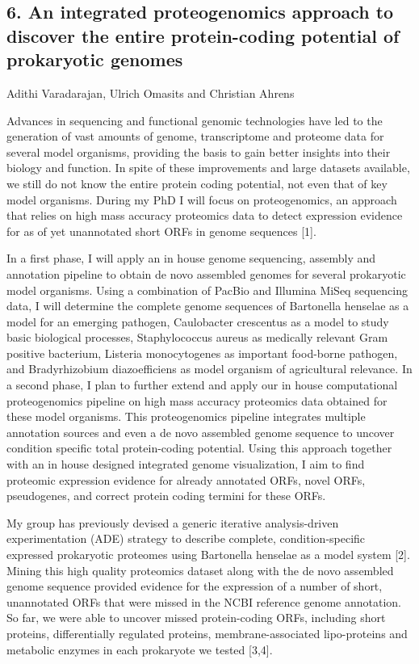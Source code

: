 \subsection*{\color{eubicRed} 6. An integrated proteogenomics approach to discover the entire protein-coding potential of prokaryotic genomes}
{\color{eubicGray}Adithi Varadarajan, Ulrich Omasits and Christian Ahrens}

Advances in sequencing and functional genomic technologies have led to the generation of vast amounts of genome, transcriptome and proteome data for several model organisms, providing the basis to gain better insights into their biology and function. In spite of these improvements and large datasets available, we still do not know the entire protein coding potential, not even that of key model organisms. During my PhD I will focus on proteogenomics, an approach that relies on high mass accuracy proteomics data to detect expression evidence for as of yet unannotated short ORFs in genome sequences [1].

In a first phase, I will apply an in house genome sequencing, assembly and annotation pipeline to obtain de novo assembled genomes for several prokaryotic model organisms. Using a combination of PacBio and Illumina MiSeq sequencing data, I will determine the complete genome sequences of Bartonella henselae as a model for an emerging pathogen, Caulobacter crescentus as a model to study basic biological processes, Staphylococcus aureus as medically relevant Gram positive bacterium, Listeria monocytogenes as important food-borne pathogen, and Bradyrhizobium diazoefficiens as model organism of agricultural relevance. In a second phase, I plan to further extend and apply our in house computational proteogenomics pipeline on high mass accuracy proteomics data obtained for these model organisms. This proteogenomics pipeline integrates multiple annotation sources and even a de novo assembled genome sequence to uncover condition specific total protein-coding potential. Using this approach together with an in house designed integrated genome visualization, I aim to find proteomic expression evidence for already annotated ORFs, novel ORFs, pseudogenes, and correct protein coding termini for these ORFs.

My group has previously devised a generic iterative analysis-driven experimentation (ADE) strategy to describe complete, condition-specific expressed prokaryotic proteomes using Bartonella henselae as a model system [2]. Mining this high quality proteomics dataset along with the de novo assembled genome sequence provided evidence for the expression of a number of short, unannotated ORFs that were missed in the NCBI reference genome annotation. So far, we were able to uncover missed protein-coding ORFs, including short proteins, differentially regulated proteins, membrane-associated lipo-proteins and metabolic enzymes in each prokaryote we tested [3,4].

